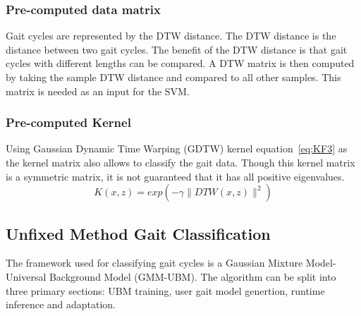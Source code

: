 \documentclass{sig-alternate}
\begin{document}
	



\subsubsection{Pre-computed data matrix}
	Gait cycles are represented by the DTW distance. The DTW distance is the distance between two gait cycles. The benefit of the DTW distance is that gait cycles with different lengths can be compared. A DTW matrix is then computed by taking the sample DTW distance and compared to all other samples. This matrix is needed as an input for the SVM.	
			
\subsubsection{Pre-computed Kernel}
Using Gaussian Dynamic Time Warping (GDTW) kernel equation~\eqref{eq:KF3} as the kernel matrix also allows to classify the gait data. Though this kernel matrix is a symmetric matrix, it is not guaranteed that it has all positive eigenvalues. 
\begin{equation} \label{eq:KF3}
K(x,z)=exp(-\gamma \parallel DTW(x,z) \parallel ^2)
\end{equation}	
    
\subsection{Unfixed Method Gait Classification}
The framework used for classifying gait cycles is a Gaussian Mixture Model-Universal Background Model (GMM-UBM). The algorithm can be split into three primary sections: UBM training, user gait model genertion, runtime inference and adaptation. 
\end{document}
